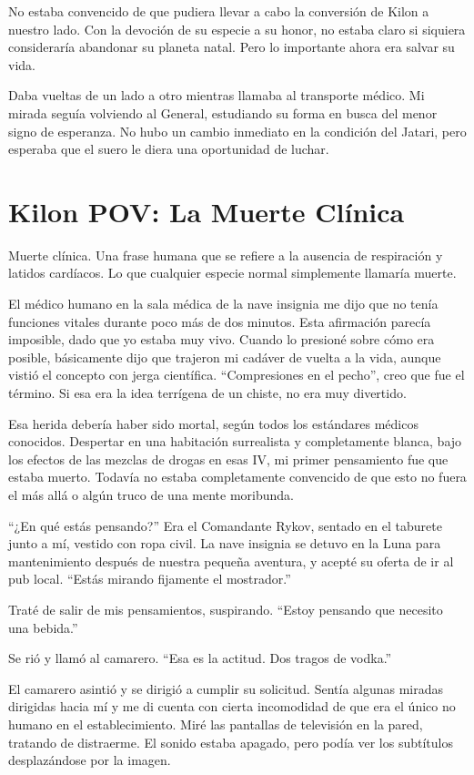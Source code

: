 \documentclass[spanish,12pt,a4paper,oneside,titlepage]{book}
\begin{document}
    No estaba convencido de que pudiera llevar a cabo la conversión de Kilon a nuestro lado. Con la devoción de su especie a su honor, no estaba claro si siquiera consideraría abandonar su planeta natal. Pero lo importante ahora era salvar su vida.

    Daba vueltas de un lado a otro mientras llamaba al transporte médico. Mi mirada seguía volviendo al General, estudiando su forma en busca del menor signo de esperanza. No hubo un cambio inmediato en la condición del Jatari, pero esperaba que el suero le diera una oportunidad de luchar.

    \chapter{Kilon POV: La Muerte Clínica}

    Muerte clínica. Una frase humana que se refiere a la ausencia de respiración y latidos cardíacos. Lo que cualquier especie normal simplemente llamaría muerte.

    El médico humano en la sala médica de la nave insignia me dijo que no tenía funciones vitales durante poco más de dos minutos. Esta afirmación parecía imposible, dado que yo estaba muy vivo. Cuando lo presioné sobre cómo era posible, básicamente dijo que trajeron mi cadáver de vuelta a la vida, aunque vistió el concepto con jerga científica. ``Compresiones en el pecho'', creo que fue el término. Si esa era la idea terrígena de un chiste, no era muy divertido.

    Esa herida debería haber sido mortal, según todos los estándares médicos conocidos. Despertar en una habitación surrealista y completamente blanca, bajo los efectos de las mezclas de drogas en esas IV, mi primer pensamiento fue que estaba muerto. Todavía no estaba completamente convencido de que esto no fuera el más allá o algún truco de una mente moribunda.

    ``¿En qué estás pensando?'' Era el Comandante Rykov, sentado en el taburete junto a mí, vestido con ropa civil. La nave insignia se detuvo en la Luna para mantenimiento después de nuestra pequeña aventura, y acepté su oferta de ir al pub local. ``Estás mirando fijamente el mostrador.''

    Traté de salir de mis pensamientos, suspirando. ``Estoy pensando que necesito una bebida.''

    Se rió y llamó al camarero. ``Esa es la actitud. Dos tragos de vodka.''

    El camarero asintió y se dirigió a cumplir su solicitud. Sentía algunas miradas dirigidas hacia mí y me di cuenta con cierta incomodidad de que era el único no humano en el establecimiento. Miré las pantallas de televisión en la pared, tratando de distraerme. El sonido estaba apagado, pero podía ver los subtítulos desplazándose por la imagen.
\end{document}
